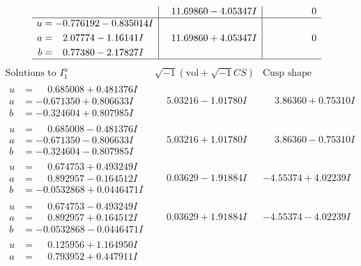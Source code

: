 \documentclass[1p]{elsarticle_modified}
\theoremstyle{definition}
\newcommand{\I}{\sqrt{-1}}
\begin{document}
$$\begin{array}{c|c|c}
 & \phantom{-}11.69860 - 4.05347 I & \phantom{-0.000000 } 0 \\ \hline\begin{aligned}
u &= -0.776192 - 0.835014 I \\
a &= \phantom{-}2.07774 - 1.16141 I \\
b &= \phantom{-}0.77380 - 2.17827 I\end{aligned}
 & \phantom{-}11.69860 + 4.05347 I & \phantom{-0.000000 } 0\\
 \hline 
 \end{array}$$\newpage$$\begin{array}{c|c|c}  
\text{Solutions to }I^u_{1}& \I (\text{vol} + \sqrt{-1}CS) & \text{Cusp shape}\\
 \hline 
\begin{aligned}
u &= \phantom{-}0.685008 + 0.481376 I \\
a &= -0.671350 + 0.806633 I \\
b &= -0.324604 + 0.807985 I\end{aligned}
 & \phantom{-}5.03216 - 1.01780 I & \phantom{-}3.86360 + 0.75310 I \\ \hline\begin{aligned}
u &= \phantom{-}0.685008 - 0.481376 I \\
a &= -0.671350 - 0.806633 I \\
b &= -0.324604 - 0.807985 I\end{aligned}
 & \phantom{-}5.03216 + 1.01780 I & \phantom{-}3.86360 - 0.75310 I \\ \hline\begin{aligned}
u &= \phantom{-}0.674753 + 0.493249 I \\
a &= \phantom{-}0.892957 - 0.164512 I \\
b &= -0.0532868 + 0.0446471 I\end{aligned}
 & \phantom{-}0.03629 - 1.91884 I & -4.55374 + 4.02239 I \\ \hline\begin{aligned}
u &= \phantom{-}0.674753 - 0.493249 I \\
a &= \phantom{-}0.892957 + 0.164512 I \\
b &= -0.0532868 - 0.0446471 I\end{aligned}
 & \phantom{-}0.03629 + 1.91884 I & -4.55374 - 4.02239 I \\ \hline\begin{aligned}
u &= \phantom{-}0.125956 + 1.164950 I \\
a &= \phantom{-}0.793952 + 0.447911 I \\

\end{aligned}
\end{array}$$
\end{document}
